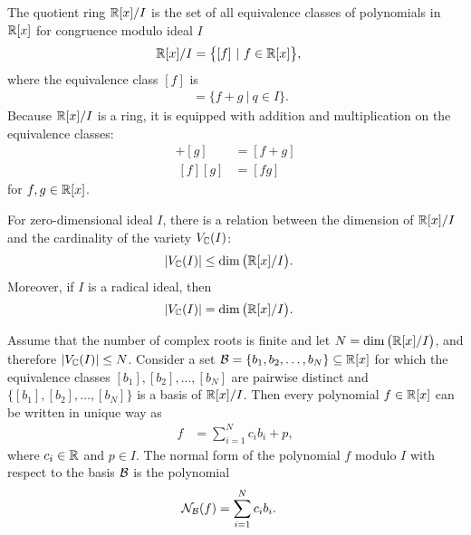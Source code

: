 The quotient ring $\mathbb{R}[x]/I$ is the set of all equivalence classes of polynomials in $\mathbb{R}[x]$ for congruence modulo ideal $I$
\begin{align}
  \mathbb{R}[x]/I &= \big\{[f]\ |\ f\in\mathbb{R}[x]\big\},
\end{align}
where the equivalence class $[f]$ is
\begin{align}
  [f] &= \big\{f+g\ |\ q\in I\big\}.
\end{align}
Because $\mathbb{R}[x]/I$ is a ring, it is equipped with addition and multiplication on the equivalence classes:
\begin{align}
  [f] + [g] &= [f + g]\\
  ~[f][g] &= [fg]
\end{align}
for $f, g\in\mathbb{R}[x]$.

For zero-dimensional ideal $I$, there is a relation between the dimension of $\mathbb{R}[x]/I$ and the cardinality of the variety $V_{\mathbb{C}}(I)$:
\begin{align}
  |V_{\mathbb{C}}(I)| &\leq \dim\big(\mathbb{R}[x]/I\big).
\end{align}
Moreover, if $I$ is a radical ideal, then
\begin{align}
  |V_{\mathbb{C}}(I)| &= \dim\big(\mathbb{R}[x]/I\big).
\end{align}

Assume that the number of complex roots is finite and let $N = \dim\big(\mathbb{R}[x]/I\big)$, and therefore $|V_{\mathbb{C}}(I)|\leq N$.
Consider a set $\mathcal{B} = \{b_1, b_2, \ldots, b_N\} \subseteq \mathbb{R}[x]$ for which the equivalence classes $[b_1], [b_2], \ldots, [b_N]$ are pairwise distinct and $\big\{[b_1], [b_2], \ldots, [b_N]\big\}$ is a basis of $\mathbb{R}[x]/I$.
Then every polynomial $f\in\mathbb{R}[x]$ can be written in unique way as
\begin{align}
  f &= \sum_{i=1}^Nc_ib_i + p,
\end{align}
where $c_i\in\mathbb{R}$ and $p\in I$.
The normal form of the polynomial $f$ modulo $I$ with respect to the basis $\mathcal{B}$ is the polynomial
\begin{align}
  \mathcal{N}_{\mathcal{B}}(f) &= \sum_{i=1}^N c_ib_i.
\end{align}

